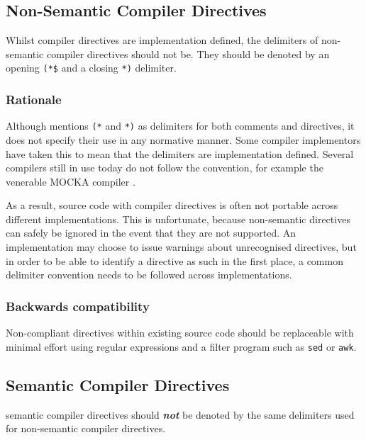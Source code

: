 \documentclass[10pt,a4paper]{article}
\renewcommand{\emph}[1]{\textbf{\textit{#1}}}
\begin{document}
\subsection{Non-Semantic Compiler Directives}

Whilst \glspl{compiler directive} are implementation defined, the delimiters of
\glspl{non-semantic compiler directive} should not be. They should be denoted
by an opening \verb|(*$| and a closing \verb|*)| delimiter.

\subsubsection{Rationale}

Although \cite[p.18]{Wirth88} mentions \verb|(*| and \verb|*)| as delimiters
for both comments and directives, it does not specify their use in any
normative manner. Some compiler implementors have taken this to mean that
the delimiters are implementation defined. Several compilers still in use
today do not follow the convention, for example the venerable MOCKA compiler
\cite{MOCKA}.

As a result, source code with \glspl{compiler directive} is often not portable
across different implementations. This is unfortunate, because non-semantic
directives can safely be ignored in the event that they are not supported. An
implementation may choose to issue warnings about unrecognised directives, but
in order to be able to identify a directive as such in the first place, a
common delimiter convention needs to be followed across implementations.

\subsubsection{Backwards compatibility}

Non-compliant directives within existing source code should be replaceable with
minimal effort using regular expressions and a filter program such as
\verb|sed| or \verb|awk|. 


\subsection{Semantic Compiler Directives}

\Glspl{semantic compiler directive} should \emph{not} be denoted by the same
delimiters used for \glspl{non-semantic compiler directive}.
\end{document}
